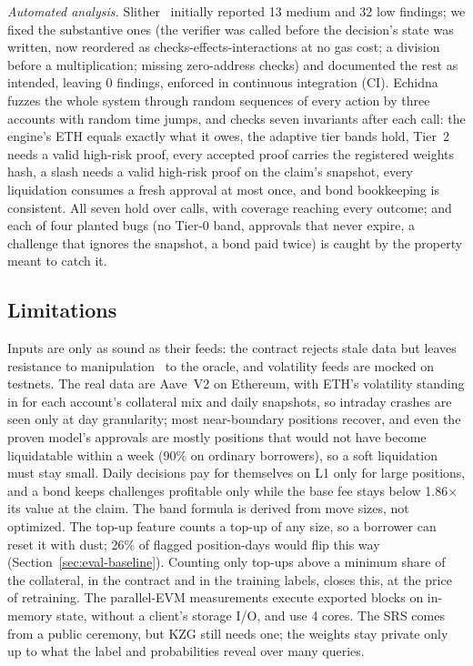 \documentclass[sigconf,nonacm]{acmart}
\begin{document}
\textit{Automated analysis.} Slither~\cite{feist2019slither} initially reported 13 medium and 32 low findings; we fixed the substantive ones (the verifier was called before the decision's state was written, now reordered as checks-effects-interactions at no gas cost; a division before a multiplication; missing zero-address checks) and documented the rest as intended, leaving 0 findings, enforced in continuous integration (CI). Echidna~\cite{grieco2020echidna} fuzzes the whole system through random sequences of every action by three accounts with random time jumps, and checks seven invariants after each call: the engine's ETH equals exactly what it owes, the adaptive tier bands hold, Tier~2 needs a valid high-risk proof, every accepted proof carries the registered weights hash, a slash needs a valid high-risk proof on the claim's snapshot, every liquidation consumes a fresh approval at most once, and bond bookkeeping is consistent. All seven hold over \echidnaCalls{} calls, with coverage reaching every outcome; and each of four planted bugs (no Tier-0 band, approvals that never expire, a challenge that ignores the snapshot, a bond paid twice) is caught by the property meant to catch it.

\subsection{Limitations}
\label{sec:limits}

Inputs are only as sound as their feeds: the contract rejects stale data but leaves resistance to manipulation~\cite{zhou2023sok,eskandari2021oracles} to the oracle, and volatility feeds are mocked on testnets. The real data are Aave~V2 on Ethereum, with ETH's volatility standing in for each account's collateral mix and daily snapshots, so intraday crashes are seen only at day granularity; most near-boundary positions recover, and even the proven model's approvals are mostly positions that would not have become liquidatable within a week (90\% on ordinary borrowers), so a soft liquidation must stay small. Daily decisions pay for themselves on L1 only for large positions, and a bond keeps challenges profitable only while the base fee stays below 1.86$\times$ its value at the claim. The band formula is derived from move sizes, not optimized. The top-up feature counts a top-up of any size, so a borrower can reset it with dust; 26\% of flagged position-days would flip this way (Section~\ref{sec:eval-baseline}). Counting only top-ups above a minimum share of the collateral, in the contract and in the training labels, closes this, at the price of retraining. The parallel-EVM measurements execute exported blocks on in-memory state, without a client's storage I/O, and use 4 cores. The SRS comes from a public ceremony, but KZG still needs one; the weights stay private only up to what the label and probabilities reveal over many queries.
\end{document}

